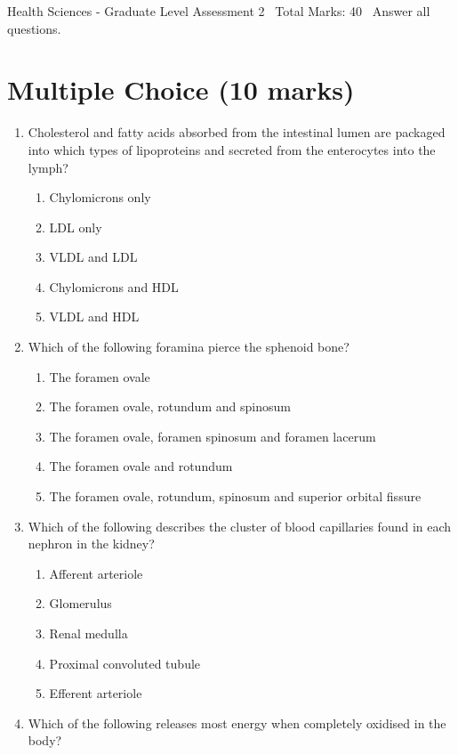 \documentclass[12pt]{article}
\begin{document}
\begin{center}
Health Sciences - Graduate Level Assessment 2 \
Total Marks: 40 \
Answer all questions.
\end{center}

\section*{Multiple Choice (10 marks)}
\begin{enumerate}[label=\arabic*.]
\item Cholesterol and fatty acids absorbed from the intestinal lumen are packaged into which types of lipoproteins and secreted from the enterocytes into the lymph?
\begin{enumerate}[label=(\alph*)]
    \item Chylomicrons only
    \item LDL only
    \item VLDL and LDL
    \item Chylomicrons and HDL
    \item VLDL and HDL
\end{enumerate}
\item Which of the following foramina pierce the sphenoid bone?
\begin{enumerate}[label=(\alph*)]
    \item The foramen ovale
    \item The foramen ovale, rotundum and spinosum
    \item The foramen ovale, foramen spinosum and foramen lacerum
    \item The foramen ovale and rotundum
    \item The foramen ovale, rotundum, spinosum and superior orbital fissure
\end{enumerate}
\item Which of the following describes the cluster of blood capillaries found in each nephron in the kidney?
\begin{enumerate}[label=(\alph*)]
    \item Afferent arteriole
    \item Glomerulus
    \item Renal medulla
    \item Proximal convoluted tubule
    \item Efferent arteriole
\end{enumerate}
\item Which of the following releases most energy when completely oxidised in the body?

\end{enumerate}
\end{document}
